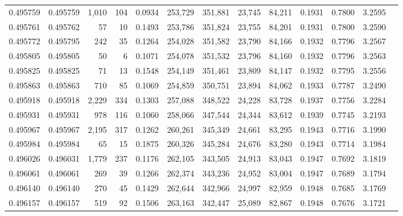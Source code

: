 \begin{tabular}{rrrrrrrrrrrrr}
0.495759 & 0.495759 & 1,010 &   104 &                                     0.0934 & 253,729 & 351,881 &  23,745 &  84,211 & 0.1931 & 0.7800 & 3.2595 \\
0.495761 & 0.495762 &    57 &    10 &                                     0.1493 & 253,786 & 351,824 &  23,755 &  84,201 & 0.1931 & 0.7800 & 3.2590 \\
0.495772 & 0.495795 &   242 &    35 &                                     0.1264 & 254,028 & 351,582 &  23,790 &  84,166 & 0.1932 & 0.7796 & 3.2567 \\
0.495805 & 0.495805 &    50 &     6 &                                     0.1071 & 254,078 & 351,532 &  23,796 &  84,160 & 0.1932 & 0.7796 & 3.2563 \\
0.495825 & 0.495825 &    71 &    13 &                                     0.1548 & 254,149 & 351,461 &  23,809 &  84,147 & 0.1932 & 0.7795 & 3.2556 \\
0.495863 & 0.495863 &   710 &    85 &                                     0.1069 & 254,859 & 350,751 &  23,894 &  84,062 & 0.1933 & 0.7787 & 3.2490 \\
0.495918 & 0.495918 & 2,229 &   334 &                                     0.1303 & 257,088 & 348,522 &  24,228 &  83,728 & 0.1937 & 0.7756 & 3.2284 \\
0.495931 & 0.495931 &   978 &   116 &                                     0.1060 & 258,066 & 347,544 &  24,344 &  83,612 & 0.1939 & 0.7745 & 3.2193 \\
0.495967 & 0.495967 & 2,195 &   317 &                                     0.1262 & 260,261 & 345,349 &  24,661 &  83,295 & 0.1943 & 0.7716 & 3.1990 \\
0.495984 & 0.495984 &    65 &    15 &                                     0.1875 & 260,326 & 345,284 &  24,676 &  83,280 & 0.1943 & 0.7714 & 3.1984 \\
0.496026 & 0.496031 & 1,779 &   237 &                                     0.1176 & 262,105 & 343,505 &  24,913 &  83,043 & 0.1947 & 0.7692 & 3.1819 \\
0.496061 & 0.496061 &   269 &    39 &                                     0.1266 & 262,374 & 343,236 &  24,952 &  83,004 & 0.1947 & 0.7689 & 3.1794 \\
0.496140 & 0.496140 &   270 &    45 &                                     0.1429 & 262,644 & 342,966 &  24,997 &  82,959 & 0.1948 & 0.7685 & 3.1769 \\
0.496157 & 0.496157 &   519 &    92 &                                     0.1506 & 263,163 & 342,447 &  25,089 &  82,867 & 0.1948 & 0.7676 & 3.1721 \\

\end{tabular}
